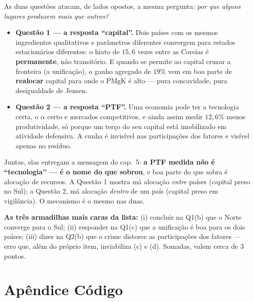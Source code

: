 \documentclass[11pt, a4paper]{article}
\begin{document}
\begin{tcolorbox}[theorybox, title={O que a Lista 2 está realmente testando}]
\small
As duas questões atacam, de lados opostos, a mesma pergunta: \emph{por que alguns lugares
produzem mais que outros?}

\begin{itemize}
\item \textbf{Questão 1 --- a resposta ``capital''.} Dois países com os mesmos ingredientes
qualitativos e parâmetros diferentes convergem para estados estacionários diferentes: o
hiato de $15{,}6$ vezes entre as Coreias é \textbf{permanente}, não transitório. E quando
se permite ao capital cruzar a fronteira (a unificação), o ganho agregado de $19\%$ vem em
boa parte de \textbf{realocar} capital para onde o $\mathrm{PMgK}$ é alto --- pura
concavidade, pura desigualdade de Jensen.
\item \textbf{Questão 2 --- a resposta ``PTF''.} Uma economia pode ter a tecnologia certa,
o $\alpha$ certo e mercados competitivos, e ainda assim medir $12{,}6\%$ menos
produtividade, só porque um terço do seu capital está imobilizado em atividade defensiva. A
cunha é invisível nas participações dos fatores e visível apenas no resíduo.
\end{itemize}

Juntas, elas entregam a mensagem do cap.\ 5: \textbf{a PTF medida não é ``tecnologia'' ---
é o nome do que sobrou}, e boa parte do que sobra é alocação de recursos. A Questão 1
mostra má alocação \emph{entre} países (capital preso no Sul); a Questão 2, má alocação
\emph{dentro} de um país (capital preso em vigilância). O mecanismo é o mesmo nas duas.

\smallskip
\textbf{As três armadilhas mais caras da lista:} (i) concluir na Q1(b) que o Norte converge
para o Sul; (ii) responder na Q1(c) que a unificação é boa para os dois países; (iii) dizer
na Q2(b) que o crime distorce as participações dos fatores --- erro que, além do próprio
item, inviabiliza (c) e (d). Somadas, valem cerca de 3 pontos.
\end{tcolorbox}

\section*{Apêndice \quad Código}
\end{document}
